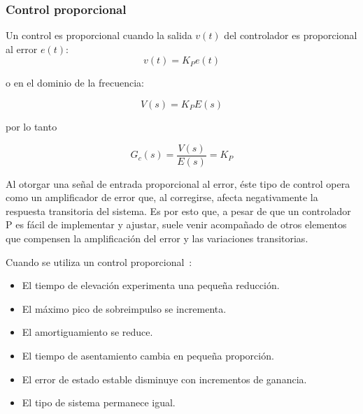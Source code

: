%
%


\subsubsection{Control proporcional}%
\label{sec:control-p}
Un control es proporcional cuando la salida $v(t)$ del controlador es proporcional al error $e(t)$:
\begin{equation*}
v(t ) = K_{P} e(t)
\end{equation*}

\noindent o en el dominio de la frecuencia:

\begin{equation*}
V(s) = K_{P} E(s)
\end{equation*}

\noindent por lo tanto

\begin{equation}
G_{c}(s) = \frac{V(s)}{E(s)} = K_{P}
\label{eqn:ctrl-p}
\end{equation}

Al otorgar una señal de entrada proporcional al error, éste tipo de control opera como un amplificador de error que, al corregirse, afecta negativamente la respuesta transitoria del sistema.
Es por esto que, a pesar de que un controlador P es fácil de implementar y ajustar, suele venir acompañado de otros elementos que compensen la amplificación del error y las variaciones transitorias.

Cuando se utiliza un control proporcional~:
\begin{itemize}[noitemsep]
	\item El tiempo de elevación experimenta una pequeña reducción.
	\item El máximo pico de sobreimpulso se incrementa.
	\item El amortiguamiento se reduce.
	\item El tiempo de asentamiento cambia en pequeña proporción.
	\item El error de estado estable disminuye con incrementos de ganancia.
	\item El tipo de sistema permanece igual.
\end{itemize}

